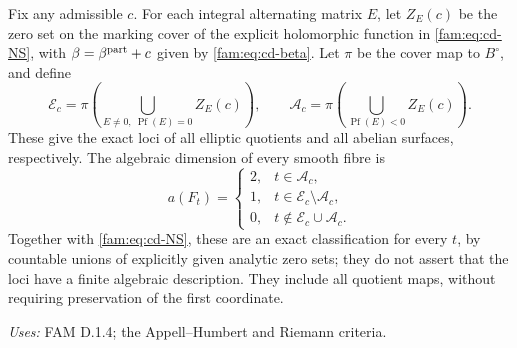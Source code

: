 \begin{theorem}[FAM D.1.6; T]\label{fam:D.1.6}
Fix any admissible $c$. For each integral alternating matrix $E$, let
$Z_E(c)$ be the zero set on the marking cover of the explicit holomorphic
function in \eqref{fam:eq:cd-NS}, with $\beta=\beta^{\rm part}+c$ given by
\eqref{fam:eq:cd-beta}. Let $\pi$ be the cover map to $B^\circ$, and define
\[
 \mathcal E_c=\pi\!\left(\bigcup_{E\ne0,\ \operatorname{Pf}(E)=0}Z_E(c)\right),
 \qquad
 \mathcal A_c=\pi\!\left(\bigcup_{\operatorname{Pf}(E)<0}Z_E(c)\right).
\]
These give the exact loci of all elliptic quotients and all abelian
surfaces, respectively. The algebraic dimension of every smooth fibre is
\[
 a(F_t)=
 \begin{cases}
 2,&t\in\mathcal A_c,\\
 1,&t\in\mathcal E_c\setminus\mathcal A_c,\\
 0,&t\notin\mathcal E_c\cup\mathcal A_c.
 \end{cases}
\]
Together with \eqref{fam:eq:cd-NS}, these are an exact classification for every
$t$, by countable unions of explicitly given analytic zero sets; they do
not assert that the loci have a finite algebraic description. They include
all quotient maps, without requiring preservation of the first coordinate.
\end{theorem}
\noindent\emph{Uses:} FAM D.1.4; the Appell--Humbert and Riemann criteria.\par

